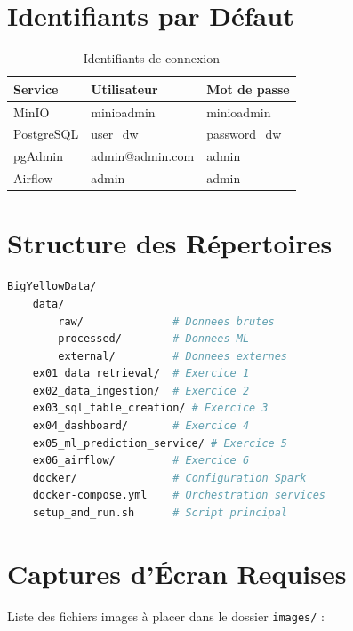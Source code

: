 \documentclass[12pt,a4paper]{report}
\begin{document}
\chapter{Identifiants par Défaut}

\begin{table}[H]
\centering
\caption{Identifiants de connexion}
\begin{tabular}{@{}lll@{}}
\toprule
\textbf{Service} & \textbf{Utilisateur} & \textbf{Mot de passe} \\
\midrule
MinIO & minioadmin & minioadmin \\
PostgreSQL & user\_dw & password\_dw \\
pgAdmin & admin@admin.com & admin \\
Airflow & admin & admin \\
\bottomrule
\end{tabular}
\end{table}

\chapter{Structure des Répertoires}

\begin{lstlisting}[language=bash, caption=Arborescence du projet]
BigYellowData/
    data/
        raw/              # Donnees brutes
        processed/        # Donnees ML
        external/         # Donnees externes
    ex01_data_retrieval/  # Exercice 1
    ex02_data_ingestion/  # Exercice 2
    ex03_sql_table_creation/ # Exercice 3
    ex04_dashboard/       # Exercice 4
    ex05_ml_prediction_service/ # Exercice 5
    ex06_airflow/         # Exercice 6
    docker/               # Configuration Spark
    docker-compose.yml    # Orchestration services
    setup_and_run.sh      # Script principal
\end{lstlisting}

\chapter{Captures d'Écran Requises}

Liste des fichiers images à placer dans le dossier \texttt{images/} :
\end{document}
